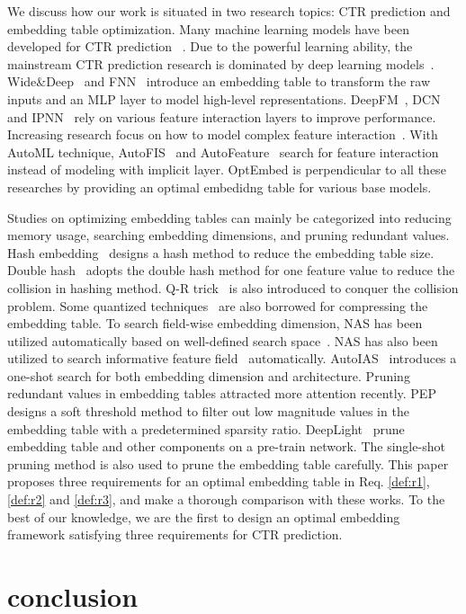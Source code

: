 \documentclass[sigconf]{acmart}
\begin{document}
We discuss how our work is situated in two research topics: CTR prediction and embedding table optimization. Many machine learning models have been developed for CTR prediction ~\cite{ADS,LR,FM}. Due to the powerful learning ability, the mainstream CTR prediction research is dominated by deep learning models~\cite{fuxictr,DLRM}. Wide\&Deep~\cite{Wide_Deep} and FNN~\cite{FNN} introduce an embedding table to transform the raw inputs and an MLP layer to model high-level representations. DeepFM~\cite{DeepFM}, DCN~\cite{DCN} and IPNN~\cite{IPNN} rely on various feature interaction layers to improve performance. Increasing research focus on how to model complex feature interaction~\cite{AutoFis, AutoFeature,optinter}. With AutoML technique, AutoFIS~\cite{AutoFis} and AutoFeature~\cite{AutoFeature} search for feature interaction instead of modeling with implicit layer. 
OptEmbed is perpendicular to all these researches by providing an optimal embedidng table for various base models.

Studies on optimizing embedding tables can mainly be categorized into reducing memory usage, searching embedding dimensions, and pruning redundant values. Hash embedding~\cite{featurehashing} designs a hash method to reduce the embedding table size. Double hash~\cite{doublehashing} adopts the double hash method for one feature value to reduce the collision in hashing method. Q-R trick~\cite{QR} is also introduced to conquer the collision problem. Some quantized techniques~\cite{MGQE,xlightfm} are also borrowed for compressing the embedding table. To search field-wise embedding dimension, NAS has been utilized automatically based on well-defined search space~\cite{AutoDim,MDE, DNIS}. NAS has also been utilized to search informative feature field~\cite{autofield} automatically. AutoIAS~\cite{AutoIAS} introduces a one-shot search for both embedding dimension and architecture. Pruning redundant values in embedding tables attracted more attention recently. PEP~\cite{PEP} designs a soft threshold method to filter out low magnitude values in the embedding table with a predetermined sparsity ratio. DeepLight~\cite{deeplight} prune embedding table and other components on a pre-train network. The single-shot~\cite{single-shot} pruning method is also used to prune the embedding table carefully. This paper proposes three requirements for an optimal embedding table in Req. \ref{def:r1}, \ref{def:r2} and \ref{def:r3}, and make a thorough comparison with these works. To the best of our knowledge, we are the first to design an optimal embedding framework satisfying three requirements for CTR prediction.  \section{conclusion}
\label{sec:conclusion}
\end{document}
